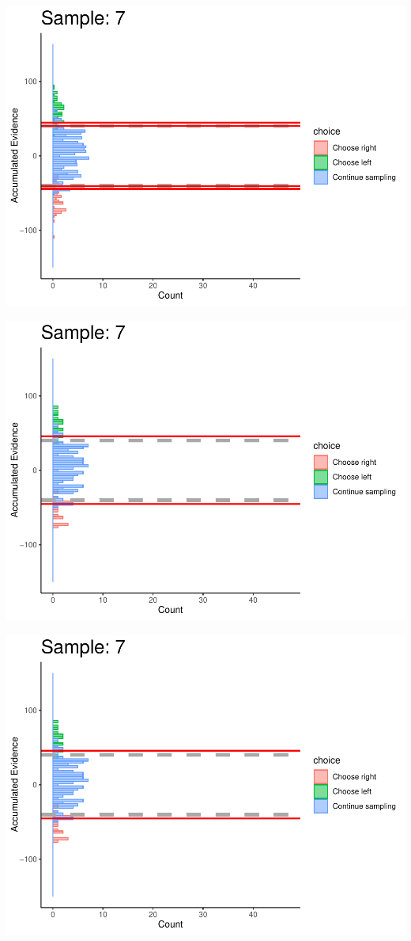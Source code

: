 \documentclass[
]{book}
\begin{document}
\begin{center}\includegraphics[width=0.8\linewidth]{LateNightBayes_files/figure-latex/collapsing_dcb-59} \end{center}

\begin{center}\includegraphics[width=0.8\linewidth]{LateNightBayes_files/figure-latex/collapsing_dcb-60} \end{center}

\begin{center}\includegraphics[width=0.8\linewidth]{LateNightBayes_files/figure-latex/collapsing_dcb-61} \end{center}
\end{document}

